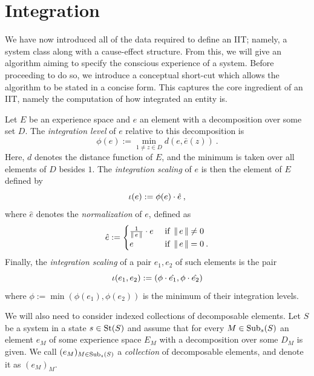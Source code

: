 \section{Integration} \label{sec:Integration}

We have now introduced all of the data required to define an IIT; namely, a system class along with a cause-effect structure. From this, we will give an algorithm aiming to specify the conscious experience of a system. Before proceeding to do so, we introduce a conceptual short-cut
which allows the algorithm to be stated in a concise form. This captures the core ingredient of an IIT, namely the computation of how integrated an entity is.

\begin{definition}\label{def:IntScaling}
Let $E$ be an experience space and $e$ an element with a decomposition over some set $D$. The \emph{integration level} of $e$ relative to this decomposition is 
\begin{equation}\label{eq:IntegrLevel}
\phi(e) := \min_{1 \neq z \in D} d(e, \bar{e}(z)) \:.
\end{equation}
Here, $d$ denotes the distance function of $E$, and the minimum is taken over all elements of $D$ besides $1$. The \emph{integration scaling} of $e$ is then the element of $E$ defined by
\begin{equation}\label{eq:IntegrData}
	\iota(e) := \phi(e) \cdot \hat{e} \:,
\end{equation}
where $\hat e$ denotes the \emph{normalization} of $e$, defined as
\begin{align*}
\hat e := \begin{cases}
\frac{1}{\operatorname{| \hspace*{-0.1em}|} e \operatorname{| \hspace*{-0.1em}|}} \cdot e & \textrm{ if } \operatorname{| \hspace*{-0.1em}|} e \operatorname{| \hspace*{-0.1em}|} \neq 0 \\
 e & \textrm{ if } \operatorname{| \hspace*{-0.1em}|} e \operatorname{| \hspace*{-0.1em}|} = 0 \:.
\end{cases}
\end{align*}
Finally, the \emph{integration scaling} of a pair $e_1, e_2$ of such elements is the pair
\begin{equation}\label{eq:IntScalingPair}
\iota(e_1, e_2) :=
(\phi \cdot \hat{e_1},
\phi \cdot \hat{e_2})
\end{equation}
where $\phi := \min(\phi(e_1), \phi(e_2))$
is the minimum of their integration levels.
\end{definition}

We will also need to consider indexed collections of decomposable elements.
Let $S$ be a system in a state $s \in \text{St}(S)$ and assume that for every $M \in \mathrm{Sub}_s(S)$
an element $e_M$ of some experience space $E_M$ with a decomposition over some $D_M$ is given. We call
$(e_M)_{M \in \mathrm{Sub}_s(S)}$ a \emph{collection} of decomposable elements, and denote it as
$(e_M)_M$.

